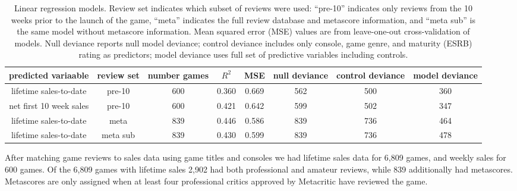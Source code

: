 \documentclass[letterpaper]{article}
\begin{document}
\begin{table}[tb]
\centering
\scriptsize
\begin{tabular}{|c|c|c|c|c|c|c|c|}
\hline\textbf{ predicted variaable} & \textbf{review set} & \textbf{number games} & $R^2$ & MSE & null deviance & control deviance & model deviance \\ 
\hline lifetime sales-to-date & pre-10 & 600 & 0.360 & 0.669 & 562 & 500 & 360\\ 
\hline net first 10 week sales & pre-10 & 600 & 0.421 & 0.642 & 599 & 502 & 347\\ 
\hline lifetime sales-to-date & meta & 839 & 0.446 & 0.586 & 839 & 736 & 464\\ 
\hline lifetime sales-to-date & meta sub & 839 & 0.430 & 0.599 & 839 & 736 & 478\\ 
\hline 
\end{tabular}
\caption{Linear regression models. Review set indicates which subset of reviews were used:
``pre-10'' indicates only reviews from the 10 weeks prior to the launch of the game,
``meta'' indicates the full review database and metascore information, and ``meta sub'' is the same model without metascore information. 
Mean squared error (MSE) values are from leave-one-out cross-validation of models. Null deviance reports null model deviance; control deviance includes only console, game genre, and maturity (ESRB) rating as predictors; model deviance uses full set of predictive variables including controls.}
\label{tab:regression_models}
\end{table}

After matching game reviews to sales data using game titles and consoles we had lifetime sales data for 6,809 games, and weekly sales for 600 games. Of the 6,809 games with lifetime sales 2,902 had both professional and amateur reviews, while 839 additionally had metascores. Metascores are only assigned when at least four professional critics approved by Metacritic have reviewed the game.
\end{document}
